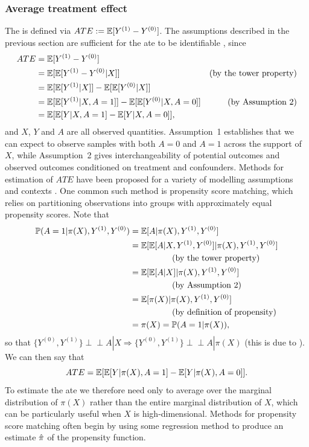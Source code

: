 \documentclass[thesis.tex]{subfiles}
\begin{document}
\subsubsection{Average treatment effect}
The  is defined via $ATE := \mathbb{E}[Y^{(1)} -Y^{(0)}]$. The assumptions described in the previous section are sufficient for the \gls{ate} to be identifiable \citep{stone_assumptions_1993}, since 
\begin{align*}
    ATE & = \mathbb{E}[Y^{(1)} - Y^{(0)} ] & \\
    & = \mathbb{E}[\mathbb{E}[Y^{(1)} - Y^{(0)} | X]] & \text{(by the tower property)} \\
    & = \mathbb{E}[\mathbb{E}[Y^{(1)} | X]] - \mathbb{E}[\mathbb{E}[Y^{(0)} | X]] & \\ 
    & = \mathbb{E}[\mathbb{E}[Y^{(1)} | X, A = 1]] - \mathbb{E}[\mathbb{E}[Y^{(0)} | X, A = 0]] & \text{(by Assumption~2)} \\
    & = \mathbb{E}[\mathbb{E}[Y | X, A = 1] - \mathbb{E}[Y | X, A = 0]], & \label{eq:ate}
\end{align*}
and $X$, $Y$ and $A$ are all observed quantities. Assumption~1 establishes that we can expect to observe samples with both $A=0$ and $A=1$ across the support of $X$, while Assumption~2 gives interchangeability of potential outcomes and observed outcomes conditioned on treatment and confounders. Methods for estimation of $ATE$ have been proposed for a variety of modelling assumptions and contexts \citep{reiersol_confluence_1945, thistlethwaite_regression-discontinuity_1960, rosenbaum_central_1983, abadie_semiparametric_2005, craig_natural_2017, roth_whats_2023}. One common such method is propensity score matching, which relies on partitioning observations into groups with approximately equal propensity scores. Note that 
\begin{align*}
    \mathbb{P}(A=1 | \pi(X), Y^{(1)}, Y^{(0)}) & = \mathbb{E}[A | \pi(X), Y^{(1)}, Y^{(0)}]  \\
    & = \mathbb{E}[\mathbb{E}[A | X, Y^{(1)}, Y^{(0)}] | \pi(X), Y^{(1)}, Y^{(0)}] \\
    & \hspace{50pt} \text{(by the tower property)}\\
    & = \mathbb{E}[\mathbb{E}[A|X]|\pi(X), Y^{(1)}, Y^{(0)}] \\ & \hspace{50pt} \text{(by Assumption~2)} \\
    & = \mathbb{E}[\pi(X) | \pi(X), Y^{(1)}, Y^{(0)}] 
 \\ & \hspace{50pt} \text{(by definition of propensity)} \\
    & = \pi(X) = \mathbb{P}(A=1|\pi(X)), 
\end{align*}
so that $\{Y^{(0)}, Y^{(1)}\} \perp\!\!\!\perp A | X \Rightarrow \{Y^{(0)}, Y^{(1)}\} \perp\!\!\!\perp A | \pi(X)$ (this is due to \citealt{rosenbaum_central_1983}). We can then say that
\[ATE = \mathbb{E}[\mathbb{E}[Y|\pi(X), A=1] - \mathbb{E}[Y|\pi(X), A=0]].\]
To estimate the \gls{ate} we therefore need only to average over the marginal distribution of $\pi(X)$ rather than the entire marginal distribution of $X$, which can be particularly useful when $X$ is high-dimensional. Methods for propensity score matching often begin by using some regression method to produce an estimate $\hat{\pi}$ of the propensity function.
\end{document}
